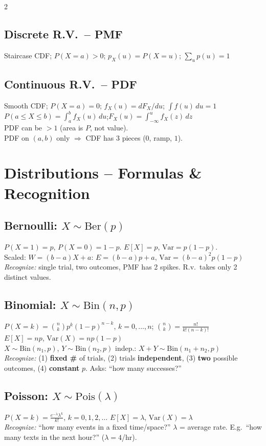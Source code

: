 \documentclass[10pt]{article}
\begin{document}
\begin{multicols*}{2}
\subsection{Discrete R.V.\ -- PMF}
Staircase CDF; $P(X=a) > 0$;\; $p_X(u) = P(X=u)$;\; $\sum_u p(u) = 1$

\subsection{Continuous R.V.\ -- PDF}
Smooth CDF; $P(X=a)=0$;\; $f_X(u) = dF_X/du$;\; $\int f(u)\,du = 1$ \\
$P(a \le X \le b) = \int_a^b f_X(u)\,du$;\quad $F_X(u) = \int_{-\infty}^{u} f_X(z)\,dz$ \\
PDF can be $>1$ (area is $P$, not value). \\
PDF on $(a,b)$ only $\Rightarrow$ CDF has 3 pieces ($0$, ramp, $1$).

\section{Distributions -- Formulas \& Recognition}

\subsection{Bernoulli: $X \sim \text{Ber}(p)$}
$P(X\!=\!1)=p$,\; $P(X\!=\!0)=1-p$.\;
$E[X]=p$,\; $\text{Var}=p(1-p)$. \\
Scaled: $W = (b\!-\!a)X + a$: $E=(b\!-\!a)p+a$, $\text{Var}=(b\!-\!a)^2p(1\!-\!p)$ \\
\textit{Recognize:} single trial, two outcomes, PMF has 2 spikes. R.v.\ takes only 2 distinct values.

\subsection{Binomial: $X \sim \text{Bin}(n,p)$}
$P(X\!=\!k) = \binom{n}{k} p^k (1-p)^{n-k}$, $k=0,\ldots,n$;\;
$\binom{n}{k} = \frac{n!}{k!(n-k)!}$ \\
$E[X] = np$,\; $\text{Var}(X) = np(1-p)$ \\
$X\!\sim\!\text{Bin}(n_1,p)$, $Y\!\sim\!\text{Bin}(n_2,p)$ indep.: $X+Y \sim \text{Bin}(n_1\!+\!n_2, p)$ \\
\textit{Recognize:} (1) \textbf{fixed \#} of trials, (2) trials \textbf{independent}, (3) \textbf{two} possible outcomes, (4) \textbf{constant} $p$. Asks: ``how many successes?''

\subsection{Poisson: $X \sim \text{Pois}(\lambda)$}
$P(X\!=\!k) = \frac{e^{-\lambda}\lambda^k}{k!}$, $k=0,1,2,\ldots$\;\;
$E[X] = \lambda$,\; $\text{Var}(X) = \lambda$ \\
\textit{Recognize:} ``how many events in a fixed time/space?'' $\lambda$ = average rate. E.g.\ ``how many texts in the next hour?'' ($\lambda = 4$/hr).


\end{multicols*}
\end{document}
